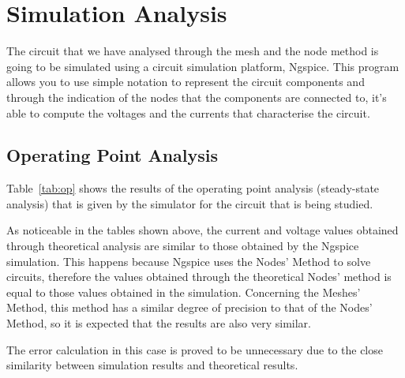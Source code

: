 \section{Simulation Analysis}
\label{sec:simulation}

The circuit that we have analysed through the mesh and the node method is going to be simulated using a circuit simulation platform, Ngspice. This program allows you to use simple notation to represent the circuit components and through the indication of the nodes that the components are connected to, it's able to compute the voltages and the currents that characterise the circuit.

\subsection{Operating Point Analysis}

Table~\ref{tab:op} shows the results of the operating point analysis (steady-state analysis) that is given by the simulator for the circuit that is being studied.

\begin{comment}

\begin{table}[h]
  \centering
  \begin{tabular}{|l|r|}
    \hline    
    {\bf Name} & {\bf Value [A or V]} \\ \hline
    
  \end{tabular}
  \caption{Operating point. A variable preceded by @ is of type {\em current}
    and expressed in Ampere; other variables are of type {\it voltage} and expressed in
    Volt.}
  \label{tab:op}
\end{table}

\end{comment}

As noticeable in the tables shown above, the current and voltage values obtained through theoretical analysis are similar to those obtained by the Ngspice simulation. This happens because Ngspice uses the Nodes' Method to solve circuits, therefore the values obtained through the theoretical Nodes' method is equal to those values obtained in the simulation. Concerning the Meshes' Method, this method has a similar degree of precision to that of the Nodes' Method, so it is expected that the results are also very similar.

The error calculation in this case is proved to be unnecessary due to the close similarity between simulation results and theoretical results.
